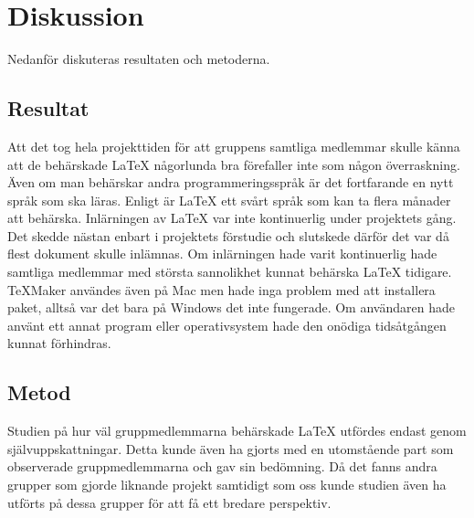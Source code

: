 \section{Diskussion}
Nedanför diskuteras resultaten och metoderna. 
\subsection{Resultat}
Att det tog hela projekttiden för att gruppens samtliga medlemmar skulle känna att de behärskade {\LaTeX} någorlunda bra förefaller inte som någon överraskning. Även om man behärskar andra programmeringsspråk är det fortfarande en nytt språk som ska läras. Enligt \citep{latexandfriends} är {\LaTeX} ett svårt språk som kan ta flera månader att behärska.
Inlärningen av {\LaTeX} var inte kontinuerlig under projektets gång. Det skedde nästan enbart i projektets förstudie och slutskede därför det var då flest dokument skulle inlämnas. Om inlärningen hade varit kontinuerlig hade samtliga medlemmar med största sannolikhet kunnat behärska {\LaTeX} tidigare.
\newline
\newline 
TeXMaker användes även på Mac men hade inga problem med att installera paket, alltså var det bara på Windows det inte fungerade. Om användaren hade använt ett annat program eller operativsystem hade den onödiga tidsåtgången kunnat förhindras.   

\subsection{Metod}
Studien på hur väl gruppmedlemmarna behärskade {\LaTeX} utfördes endast genom självuppskattningar. Detta kunde även ha gjorts med en utomstående part som observerade gruppmedlemmarna och gav sin bedömning.  
\newline
\newline
Då det fanns andra grupper som gjorde liknande projekt samtidigt som oss kunde studien även ha utförts på dessa grupper för att få ett bredare perspektiv. 